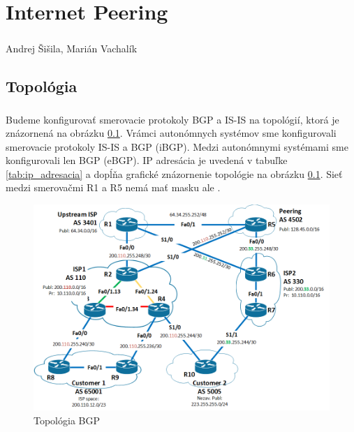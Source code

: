 \documentclass[12pt,twoside,a4paper]{report}
\begin{document}

\setcounter{chapter}{1}
\chapter*{Internet Peering}
\paragraph{}
Andrej Šišila, Marián Vachalík

\tableofcontents

\newpage
\section{Topológia}
\paragraph{}
Budeme konfigurovať smerovacie protokoly BGP a IS-IS na topológií, ktorá je znázornená na obrázku \ref{fig:bgp_isis_topo}. Vrámci autonómnych systémov sme konfigurovali smerovacie protokoly IS-IS a BGP (iBGP). Medzi autonómnymi systémami sme konfigurovali len BGP (eBGP). IP adresácia je uvedená v tabuľke \ref{tab:ip_adresacia} a dopĺňa grafické znázornenie topológie na obrázku \ref{fig:bgp_isis_topo}. Sieť medzi smerovačmi R1 a R5 nemá mať masku  ale .

\begin{figure}[!htbp]
\centering
\includegraphics[width=14cm,keepaspectratio]{bgp_isis_topo}
\caption{Topológia BGP}
\label{fig:bgp_isis_topo}
\end{figure}
\end{document}
